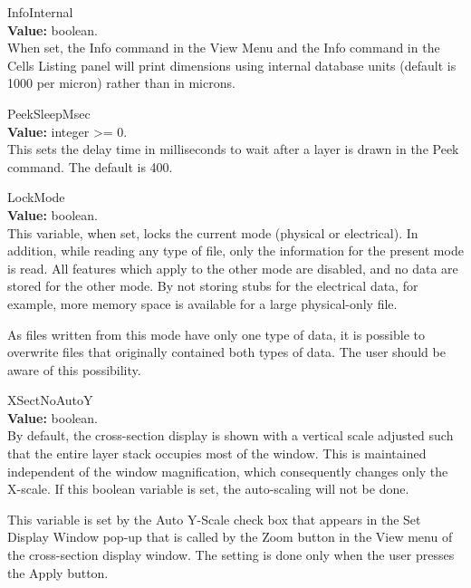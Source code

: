 \begin{description}
\item{\et InfoInternal}\\
{\bf Value:} boolean.\\
When set, the {\cb Info} command in the {\cb View Menu} and the {\cb
Info} command in the {\cb Cells Listing} panel will print dimensions
using internal database units (default is 1000 per micron) rather than
in microns.

\item{\et PeekSleepMsec}\\
{\bf Value:} integer {\vt >=} 0.\\
This sets the delay time in milliseconds to wait after a layer is
drawn in the {\cb Peek} command.  The default is 400.

\item{\et LockMode}\\
{\bf Value:} boolean.\\
This variable, when set, locks the current mode (physical or
electrical).  In addition, while reading any type of file, only the
information for the present mode is read.  All features which apply to
the other mode are disabled, and no data are stored for the other
mode.  By not storing stubs for the electrical data, for example, more
memory space is available for a large physical-only file.

As files written from this mode have only one type of data, it is
possible to overwrite files that originally contained both types of
data.  The user should be aware of this possibility.

\item{\et XSectNoAutoY}\\
{\bf Value:} boolean.\\
By default, the cross-section display is shown with a vertical scale
adjusted such that the entire layer stack occupies most of the window. 
This is maintained independent of the window magnification, which
consequently changes only the X-scale.  If this boolean variable is
set, the auto-scaling will not be done.

This variable is set by the {\cb Auto Y-Scale} check box that appears
in the {\cb Set Display Window} pop-up that is called by the {\cb
Zoom} button in the {\cb View} menu of the cross-section display
window.  The setting is done only when the user presses the {\cb
Apply} button.


\end{description}
